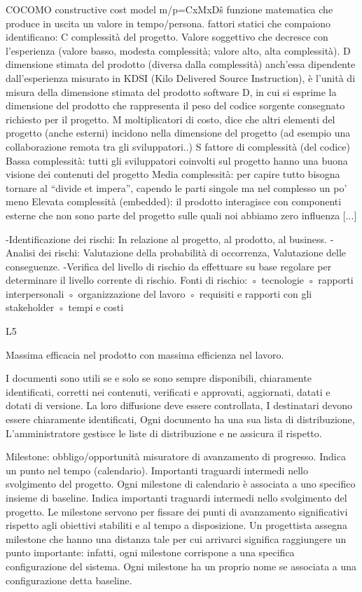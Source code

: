 \documentclass{report}
\begin{document}
COCOMO constructive cost model m/p=CxMxD\^s
funzione matematica che produce in uscita un valore in tempo/persona.
fattori statici che compaiono identificano:
C complessità del progetto. Valore soggettivo che decresce con l’esperienza (valore basso, modesta complessità; valore alto, alta complessità).
D dimensione stimata del prodotto (diversa dalla complessità) anch’essa dipendente dall’esperienza misurato in KDSI (Kilo Delivered Source Instruction), è l'unità di misura della dimensione stimata del prodotto software D, in cui si esprime la dimensione del prodotto che rappresenta il peso del codice sorgente consegnato richiesto per il progetto.
M moltiplicatori di costo, dice che altri elementi del progetto (anche esterni) incidono nella dimensione del progetto (ad esempio una collaborazione remota tra gli sviluppatori..)
S fattore di complessità (del codice)
Bassa complessità: tutti gli sviluppatori coinvolti sul progetto hanno una buona visione dei contenuti del progetto
Media complessità: per capire tutto bisogna tornare al “divide et impera”, capendo le parti singole ma nel complesso un po’ meno
Elevata complessità (embedded): il prodotto interagisce con componenti esterne che non sono parte del progetto sulle quali noi abbiamo zero influenza
[...]

-Identificazione dei rischi: In relazione al progetto, al prodotto, al business.
-Analisi dei rischi: Valutazione della probabilità di occorrenza, Valutazione delle conseguenze.
-Verifica del livello di rischio da effettuare su base regolare per determinare il livello corrente di rischio.
Fonti di rischio:
◦ tecnologie
◦ rapporti interpersonali
◦ organizzazione del lavoro
◦ requisiti e rapporti con gli stakeholder
◦ tempi e costi

L5

Massima efficacia nel prodotto con massima efficienza nel lavoro.

I documenti sono utili se e solo se sono sempre disponibili, chiaramente identificati, corretti nei contenuti, verificati e approvati, aggiornati, datati e dotati di versione.
La loro diffusione deve essere controllata, I destinatari devono essere chiaramente identificati, Ogni documento ha una sua lista di distribuzione, L’amministratore gestisce le liste di distribuzione e ne assicura il rispetto.

Milestone: obbligo/opportunità misuratore di avanzamento di progresso. Indica un punto nel tempo (calendario). Importanti traguardi intermedi nello svolgimento del progetto. Ogni milestone di calendario è associata a uno specifico insieme di baseline. Indica importanti traguardi intermedi nello svolgimento del progetto.
Le milestone servono per fissare dei punti di avanzamento significativi rispetto agli obiettivi stabiliti e al tempo a disposizione. Un progettista assegna milestone che hanno una distanza tale per cui arrivarci significa raggiungere un punto importante: infatti, ogni milestone corrispone a una specifica configurazione del sistema. Ogni milestone ha un proprio nome se associata a una configurazione detta baseline.
\end{document}
